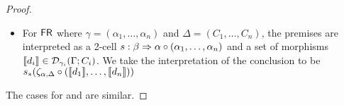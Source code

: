 \begin{proof}
\begin{itemize}
\item For $\mathsf{FR}$
where $\gamma = (\alpha_1, \dots, \alpha_n)$ and $\Delta = (C_1, \dots,
C_n)$, the premises are interpreted as a 2-cell $s : \beta \Rightarrow
{\alpha} \circ {(\alpha_1,\ldots,\alpha_n)}$ and a set of morphisms $\llbracket
d_i \rrbracket \in \mathcal{D}_{\gamma_i}(\Gamma; C_i)$. We take the interpretation of
the conclusion to be $s_*(\zeta_{\alpha, \Delta} \circ (\llbracket d_1 \rrbracket,
\dots, \llbracket d_n \rrbracket))$

\end{itemize}
The cases for \UL\/ and \UR\/ are similar.  
\end{proof}

